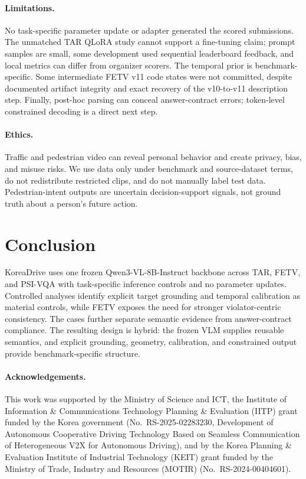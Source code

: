 \documentclass[runningheads]{llncs}
\begin{document}
\paragraph{Limitations.}
No task-specific parameter update or adapter generated the scored submissions. The unmatched TAR QLoRA study cannot support a fine-tuning claim; prompt samples are small, some development used sequential leaderboard feedback, and local metrics can differ from organizer scorers. The temporal prior is benchmark-specific. Some intermediate FETV v11 code states were not committed, despite documented artifact integrity and exact recovery of the v10-to-v11 description step. Finally, post-hoc parsing can conceal answer-contract errors; token-level constrained decoding is a direct next step.

\paragraph{Ethics.}
Traffic and pedestrian video can reveal personal behavior and create privacy, bias, and misuse risks. We use data only under benchmark and source-dataset terms, do not redistribute restricted clips, and do not manually label test data. Pedestrian-intent outputs are uncertain decision-support signals, not ground truth about a person's future action.

\section{Conclusion}
KoreaDrive uses one frozen Qwen3-VL-8B-Instruct backbone across TAR, FETV, and PSI-VQA with task-specific inference controls and no parameter updates. Controlled analyses identify explicit target grounding and temporal calibration as material controls, while FETV exposes the need for stronger violator-centric consistency. The cases further separate semantic evidence from answer-contract compliance. The resulting design is hybrid: the frozen VLM supplies reusable semantics, and explicit grounding, geometry, calibration, and constrained output provide benchmark-specific structure.

\paragraph{Acknowledgements.}
This work was supported by the Ministry of Science and ICT, the Institute of Information \& Communications Technology Planning \& Evaluation (IITP) grant funded by the Korea government (No.~RS-2025-02283230, Development of Autonomous Cooperative Driving Technology Based on Seamless Communication of Heterogeneous V2X for Autonomous Driving), and by the Korea Planning \& Evaluation Institute of Industrial Technology (KEIT) grant funded by the Ministry of Trade, Industry and Resources (MOTIR) (No.~RS-2024-00404601).



\end{document}
